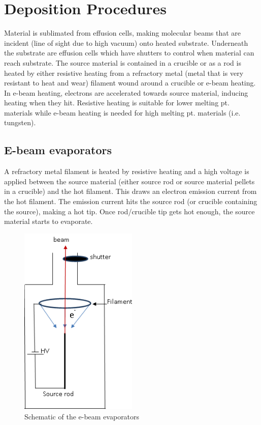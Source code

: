 \chapter{Deposition Procedures}
Material is sublimated from effusion cells, making molecular beams that are incident (line of sight due to high vacuum) onto heated substrate. Underneath the substrate are effusion cells which have shutters to control when material can reach substrate. The source material is contained in a crucible or as a rod is heated by either resistive heating from a refractory metal (metal that is very resistant to heat and wear) filament wound around a crucible or e-beam heating. In e-beam heating, electrons are accelerated towards source material, inducing heating when they hit. Resistive heating is suitable for lower melting pt. materials while e-beam heating is needed for high melting pt. materials (i.e. tungsten). 
\section{E-beam evaporators}
A refractory metal filament is heated by resistive heating and a high voltage is applied between the source material (either source rod or source material pellets in a crucible) and the hot filament. This draws an electron emission current from the hot filament. The emission current hits the source rod (or crucible containing  the source), making a hot tip. Once rod/crucible tip gets hot enough, the source material starts to evaporate.
\begin{figure}[H]
	\centering
	\includegraphics[width=0.5\textwidth]{e-beam_schematic.png}  %
	\caption{Schematic of the e-beam evaporators}
	\label{fig:e-beam}
\end{figure}
